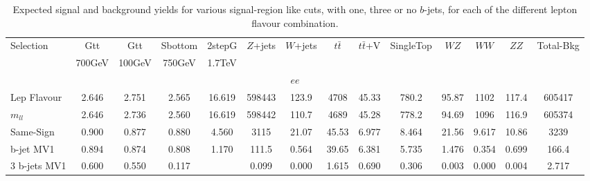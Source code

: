 \begin{table}
\caption{Expected signal and background yields for various signal-region like cuts, with one, three or no $b$-jets, for each of the different lepton flavour combination.}
\label{tab:btagging_yields_flavour}
\begin{center}{\scriptsize
        \begin{tabular}{l||cccc||cc|ccc|ccc||c }
            Selection     &          Gtt &       Gtt    & Sbottom      & 2stepG    &  $Z$+jets    &  $W$+jets    &  $t\bar t$   & $t\bar t$+V  & SingleTop    & $WZ$         & $WW$         & $ZZ$         & Total-Bkg      \\ 
                          &   700GeV     &    100GeV    &  750GeV      &  1.7TeV      &              &              &              &              &              &              &              &              &                 \\ \hline 
            \multicolumn{14}{c}{$ee$} \\ \hline                                                                                                                                                                                                                                   
            Lep Flavour   &        2.646 &        2.751 &        2.565 &     16.619 &   598443     &      123.9   &     4708     &       45.33  &      780.2   &       95.87  &     1102     &      117.4   &   605417        \\
            $m_{ll}$      &        2.646 &        2.736 &        2.560 &     16.619 &   598442     &      110.7   &     4689     &       45.28  &      778.2   &       94.69  &     1096     &      116.9   &   605374        \\        
            Same-Sign     &        0.900 &        0.877 &        0.880 &      4.560 &     3115     &       21.07  &       45.53  &        6.977 &        8.464 &       21.56  &        9.617 &       10.86  &     3239        \\\hline  

            b-jet MV1     &        0.894 &        0.874 &        0.808 &      1.170 &      111.5   &        0.564 &       39.65  &        6.381 &        5.735 &        1.476 &        0.354 &        0.699 &      166.4      \\        
            3 b-jets MV1  &        0.600 &        0.550 &        0.117 &            &        0.099 &        0.000 &        1.615 &        0.690 &        0.306 &        0.003 &        0.000 &        0.004 &        2.717    \\\hline  
                                                                                                                                                                                                                      

\end{tabular}}
\end{center}
\end{table}
